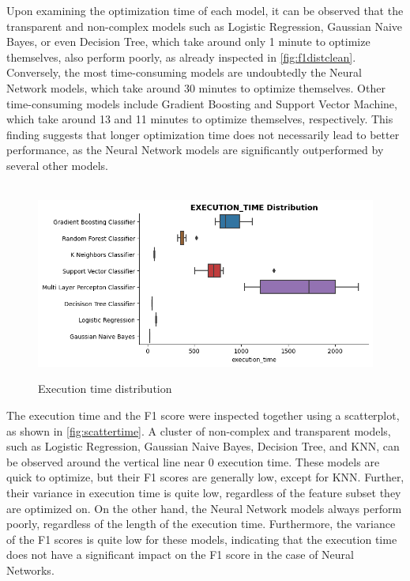 Upon examining the optimization time of each model, it can be observed that the transparent and non-complex models such as Logistic Regression, Gaussian Naive Bayes, or even Decision Tree, which take around only 1 minute to optimize themselves, also perform poorly, as already inspected in \autoref{fig:f1distclean}.
Conversely, the most time-consuming models are undoubtedly the Neural Network models, which take around 30 minutes to optimize themselves. Other time-consuming models include Gradient Boosting and Support Vector Machine, which take around 13 and 11 minutes to optimize themselves, respectively.
This finding suggests that longer optimization time does not necessarily lead to better performance, as the Neural Network models are significantly outperformed by several other models.
\begin{figure}[H]
    \centering
    \caption{Execution time distribution}\vspace{0.5em}
    \label{fig:timedist}\
    \includegraphics[width=140mm]{Figures/EXECUTION_TIME_Distribution.jpg}
    \centering{\begin{source}Author's results in Python\end{source}}\vspace{-1em}
\end{figure}

The execution time and the F1 score were inspected together using a scatterplot, as shown in \autoref{fig:scattertime}.
A cluster of non-complex and transparent models, such as Logistic Regression, Gaussian Naive Bayes, Decision Tree, and KNN, can be observed around the vertical line near 0 execution time. These models are quick to optimize, but their F1 scores are generally low, except for KNN.
Further, their variance in execution time is quite low, regardless of the feature subset they are optimized on.
On the other hand, the Neural Network models always perform poorly, regardless of the length of the execution time. Furthermore, the variance of the F1 scores is quite low for these models, indicating that the execution time does not have a significant impact on the F1 score in the case of Neural Networks.


